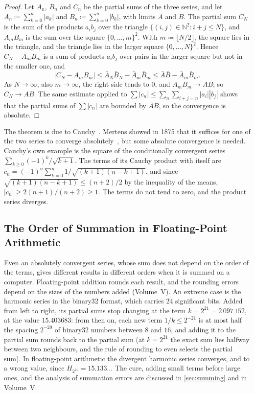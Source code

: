 \begin{proof}
Let $A_n$, $B_n$ and $C_n$ be the partial sums of the three series, and let $\bar A_n\coloneqq\sum_{k=0}^n|a_k|$ and $\bar B_n\coloneqq\sum_{k=0}^n|b_k|$, with limits $\bar A$ and $\bar B$. The partial sum $C_N$ is the sum of the products $a_ib_j$ over the triangle $\{(i,j)\in\mathbb N^2: i+j\le N\}$, and $A_mB_m$ is the sum over the square $\{0,\ldots,m\}^2$. With $m\coloneqq\lfloor N/2\rfloor$, the square lies in the triangle, and the triangle lies in the larger square $\{0,\ldots,N\}^2$. Hence $C_N-A_mB_m$ is a sum of products $a_ib_j$ over pairs in the larger square but not in the smaller one, and
\[
|C_N-A_mB_m|\le\bar A_N\bar B_N-\bar A_m\bar B_m\le\bar A\bar B-\bar A_m\bar B_m .
\]
As $N\to\infty$, also $m\to\infty$, the right side tends to $0$, and $A_mB_m\to AB$; so $C_N\to AB$. The same estimate applied to $\sum|c_n|\le\sum_n\sum_{i+j=n}|a_i||b_j|$ shows that the partial sums of $\sum|c_n|$ are bounded by $\bar A\bar B$, so the convergence is absolute.
\end{proof}

The theorem is due to Cauchy~\cite{cauchy1821}. Mertens showed in 1875 that it suffices for one of the two series to converge absolutely~\cite{mertens1875}, but some absolute convergence is needed. Cauchy's own example is the square of the conditionally convergent series $\sum_{k\ge0}(-1)^k/\sqrt{k+1}$. The terms of its Cauchy product with itself are $c_n=(-1)^n\sum_{k=0}^n1/\sqrt{(k+1)(n-k+1)}$, and since $\sqrt{(k+1)(n-k+1)}\le(n+2)/2$ by the inequality of the means, $|c_n|\ge2(n+1)/(n+2)\ge1$. The terms do not tend to zero, and the product series diverges.

\subsection{The Order of Summation in Floating-Point Arithmetic}

Even an absolutely convergent series, whose sum does not depend on the order of the terms, gives different results in different orders when it is summed on a computer. Floating-point addition rounds each result, and the rounding errors depend on the sizes of the numbers added (Volume~V). An extreme case is the harmonic series in the binary32 format, which carries $24$ significant bits. Added from left to right, its partial sums stop changing at the term $k=2^{21}=2\,097\,152$, at the value $15.403683$: from then on, each new term $1/k\le2^{-21}$ is at most half the spacing $2^{-20}$ of binary32 numbers between $8$ and $16$, and adding it to the partial sum rounds back to the partial sum (at $k=2^{21}$ the exact sum lies halfway between two neighbours, and the rule of rounding to even selects the partial sum). In floating-point arithmetic the divergent harmonic series converges, and to a wrong value, since $H_{2^{21}}=15.133\ldots$ The cure, adding small terms before large ones, and the analysis of summation errors are discussed in \cref{sec:summing} and in Volume~V.

